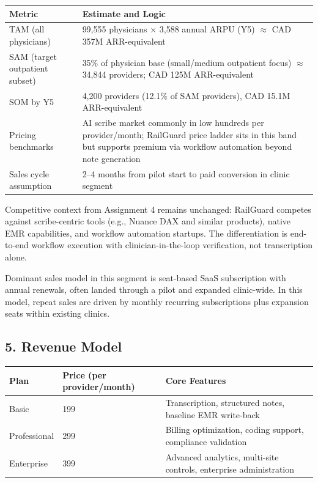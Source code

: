 \documentclass[11pt]{article}
\begin{document}
\begin{center}
\begin{tabular}{p{} p{}}
\toprule
\textbf{Metric} & \textbf{Estimate and Logic} \\
\midrule
TAM (all physicians) & 99,555 physicians $\times$ 3,588 annual ARPU (Y5) $\approx$ CAD 357M ARR-equivalent \\
SAM (target outpatient subset) & 35\% of physician base (small/medium outpatient focus) $\approx$ 34,844 providers; CAD 125M ARR-equivalent \\
SOM by Y5 & 4,200 providers (12.1\% of SAM providers), CAD 15.1M ARR-equivalent \\
Pricing benchmarks & AI scribe market commonly in low hundreds per provider/month; RailGuard price ladder sits in this band but supports premium via workflow automation beyond note generation \\
Sales cycle assumption & 2--4 months from pilot start to paid conversion in clinic segment \\
\bottomrule
\end{tabular}
\end{center}

Competitive context from Assignment 4 remains unchanged: RailGuard competes against scribe-centric tools (e.g., Nuance DAX and similar products), native EMR capabilities, and workflow automation startups. The differentiation is end-to-end workflow execution with clinician-in-the-loop verification, not transcription alone.

Dominant sales model in this segment is seat-based SaaS subscription with annual renewals, often landed through a pilot and expanded clinic-wide. In this model, repeat sales are driven by monthly recurring subscriptions plus expansion seats within existing clinics.

\subsection*{5. Revenue Model}
\begin{center}
\begin{tabular}{p{} p{} p{}}
\toprule
\textbf{Plan} & \textbf{Price (per provider/month)} & \textbf{Core Features} \\
\midrule
Basic & 199 & Transcription, structured notes, baseline EMR write-back \\
Professional & 299 & Billing optimization, coding support, compliance validation \\
Enterprise & 399 & Advanced analytics, multi-site controls, enterprise administration \\
\bottomrule
\end{tabular}
\end{center}
\end{document}
